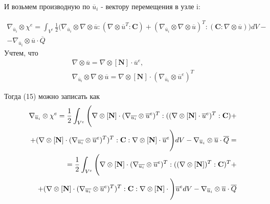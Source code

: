 \documentclass[a4paper,12pt]{article}
\begin{document}
И возьмем производную по $\overline{u}_i$ - вектору перемещения в узле i:

 
\begin{align}
\nabla_{\overline{u}_i} \otimes \chi^e = \int_{V^e} \frac{1}{2} \Bigg( \nabla_{\overline{u}_i} \otimes  \nabla \otimes \overline{u} : (\nabla \otimes \overline{u}^T:\textbf{C}) + (\nabla_{\overline{u}_i} \otimes  \nabla \otimes \overline{u})^T : (\textbf{C}:\nabla \otimes \overline{u}) \Bigg) dV - \\ - \nabla_{\overline{u}_i} \otimes\overline{u} \cdot \overline{Q}
\end{align}
Учтем, что 
\begin{equation}
\begin{split}
    \nabla \otimes \overline{u} = \nabla \otimes [\textbf{N}] \cdot \overline{u}^e, \\
    \nabla_{\overline{u}_i} \otimes \nabla \otimes \overline{u}  = \nabla \otimes [\textbf{N}] \cdot (\nabla_{\overline{u}_i} \otimes \overline{u}^e)^T
\end{split}
\end{equation}

Тогда (15) можно записать как
\begin{equation}
    \begin{split}
        \nabla_{\overline{u}_i} \otimes \chi^e = \frac{1}{2} \int_{V^e} \Bigg( \nabla \otimes [\textbf{N}] \cdot (\nabla_{\overline{u_i}} \otimes \overline{u}^e)^T:((\nabla \otimes[\textbf{N}] \cdot \overline{u}^e)^T :\textbf{C}) + \\
        + (\nabla \otimes [\textbf{N}] \cdot (\nabla_{\overline{u_i}} \otimes \overline{u}^e)^T)^T:\textbf{C}:\nabla \otimes [\textbf{N}] \cdot \overline{u}^e \Bigg) \space dV - \nabla_{\overline{u}_i} \otimes\overline{u} \cdot \overline{Q} = \\
        = \frac{1}{2}\int_{V^e} \Bigg( \nabla \otimes [\textbf{N}] \cdot (\nabla_{\overline{u_i}} \otimes \overline{u}^e)^T:((\nabla \otimes[\textbf{N}])^T:\textbf{C})^T + \\ 
        +(\nabla \otimes [\textbf{N}] \cdot (\nabla_{\overline{u_i}} \otimes \overline{u}^e)^T)^T:\textbf{C}:\nabla \otimes [\textbf{N}] \cdot  \Bigg) \overline{u}^e dV - \nabla_{\overline{u}_i} \otimes\overline{u} \cdot \overline{Q}
    \end{split}
\end{equation}
\end{document}
